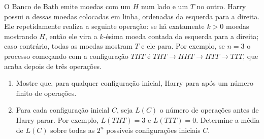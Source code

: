 O Banco de Bath emite moedas com um $H$ num lado e um $T$ no outro.
Harry possui $n$ dessas moedas colocadas em linha, ordenadas da esquerda para a direita.
Ele repetidamente realiza a seguinte operação: se há exatamente $k > 0$ moedas mostrando $H$, então ele vira a $k$-ésima moeda contada da esquerda para a direita; caso contrário, todas as moedas mostram $T$ e ele para.
Por exemplo, se $n = 3$ o processo começando com a configuração $THT$ é $THT \to HHT \to HTT \to TTT$, que acaba depois de três operações.

\begin{enumerate}[label = (\alph*)]
	\item  Mostre que, para qualquer configuração inicial, Harry para após um número finito de operações.
	\item Para cada configuração inicial $C$, seja $L(C)$ o número de operações antes de Harry parar.
		Por exemplo, $L(THT) = 3$ e $L(TTT) = 0$.
		Determine a média de $L(C)$ sobre todas as $2^n$ possíveis configurações iniciais $C$.
\end{enumerate}
